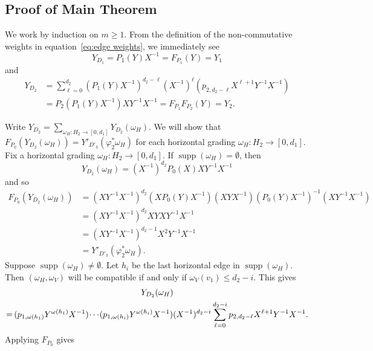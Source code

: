 \documentclass[ALCO,ThmDefs,Unicode,epreuves]{cedram}
\DeclareMathOperator{\supp}{supp}
\newcommand*{\Mk}{\mkern -2mu}
\begin{document}
\subsection{Proof of Main Theorem}
We work by induction on $m\ge1$.
From the definition of the non-commutative weights in equation~\eqref{eq:edge weights}, we immediately see 
\[Y_{D_1}=P_1(Y)X^{-1}=F_{P_1}(Y)=Y_1\]
and
\begin{align*}
 Y_{D_2}
 &=\sum\limits_{\ell=0}^{d_2} (P_1(Y)X^{-1})^{d_2-\ell}(X^{-1})^\ell(p_{2,d_2-\ell}X^{\ell+1}Y^{-1}X^{-1})\\
 &=P_2(P_1(Y)X^{-1})XY^{-1}X^{-1}=F_{P_1}F_{P_2}(Y)=Y_2.
\end{align*}

Write $Y_{D_2}=\sum\limits_{\omega_H:H_2\to[0,d_1]} Y_{D_2}(\omega_H)$.
We will show that $F_{P_0}(Y_{D_2}(\omega_H))=Y'_{D'_3}(\varphi^*_2\omega_H)$ for each horizontal grading $\omega_H:H_2\to[0,d_1]$.
Fix a horizontal grading $\omega_H:H_2\to[0,d_1]$.
If $\supp(\omega_H)=\emptyset$, then 
\[Y_{D_2}(\omega_H)=(X^{-1})^{d_2}P_0(X)XY^{-1}X^{-1}\]
and so 
\begin{align*}
 F_{P_0}(Y_{D_2}(\omega_H))
 &=(XY^{-1}X^{-1})^{d_2}(XP_0(Y)X^{-1})(XYX^{-1})(P_0(Y)X^{-1})^{-1}(XY^{-1}X^{-1})\\
 &=(XY^{-1}X^{-1})^{d_2}XYXY^{-1}X^{-1}\\
 &=(XY^{-1}X^{-1})^{d_2-1}X^2Y^{-1}X^{-1}\\
 &=Y'_{D'_3}(\varphi^*_2\omega_H).
\end{align*}
Suppose $\supp(\omega_H)\ne\emptyset$.
Let $h_i$ be the last horizontal edge in $\supp(\omega_H)$.
Then $(\omega_H,\omega_V)$ will be compatible if and only if $\omega_V(v_1)\le d_2-i$.
This gives
\begin{multline*}
Y_{D_2}(\omega_H)\\
=\Mk (p_{1,\omega(h_1)}Y^{\omega(h_1)}X^{-1})\Mk \cdots\Mk (p_{1,\omega(h_i)}Y^{\omega(h_i)}X^{-1})(X^{-1})^{d_2-i}\sum\limits_{\ell=0}^{d_2-i} p_{2,d_2-\ell}X^{\ell+1}Y^{-1}X^{-1}.
\end{multline*}
Applying $F_{P_0}$ gives
\end{document}
